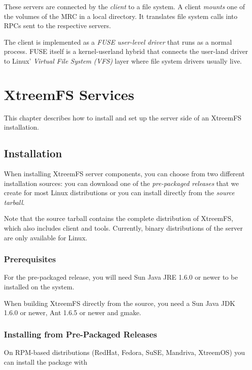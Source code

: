 \documentclass[a4paper,10pt]{book}
\begin{document}
These servers are connected by the \emph{client} to a file system. A client \emph{mounts} one of the volumes of the MRC in a local directory. It translates file system calls into RPCs sent to the respective servers.

The client is implemented as a \emph{FUSE user-level driver} that runs as a normal process. FUSE itself is a kernel-userland hybrid that connects the user-land driver to Linux' \emph{Virtual File System (VFS)} layer where file system drivers usually live.


\chapter{XtreemFS Services}

This chapter describes how to install and set up the server side of an XtreemFS installation.

\section{Installation}

When installing XtreemFS server components, you can choose from two different installation sources: you can download one of the \emph{pre-packaged releases} that we create for most Linux distributions or you can install directly from the \emph{source tarball}. 

Note that the source tarball contains the complete distribution of XtreemFS, which also includes client and tools. Currently, binary distributions of the server are only available for Linux.

\subsection{Prerequisites}

For the pre-packaged release, you will need Sun Java JRE 1.6.0 or newer to be installed on the system.

When building XtreemFS directly from the source, you need a Sun Java JDK 1.6.0 or newer, Ant 1.6.5 or newer and gmake.

\subsection{Installing from Pre-Packaged Releases}

On RPM-based distributions (RedHat, Fedora, SuSE, Mandriva, XtreemOS) you can install the package with
\end{document}
